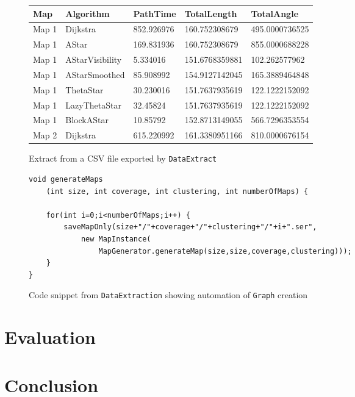 \documentclass[12pt,notitlepage]{report}
\begin{document}
\begin{figure}
\centering
    \begin{tabular}{| l | l | l | l | l |}
    \hline
    Map & Algorithm & PathTime & TotalLength & TotalAngle\\ \hline %
     Map 1 & Dijkstra & 852.926976 & 160.752308679 & 495.0000736525\\ \hline %
     Map 1 & AStar & 169.831936 & 160.752308679 & 855.0000688228\\ \hline %
     Map 1 & AStarVisibility & 5.334016 & 151.6768359881 & 102.262577962\\ \hline %
Map 1 & AStarSmoothed & 85.908992 & 154.9127142045 & 165.3889464848\\ \hline %
Map 1 & ThetaStar & 30.230016 & 151.7637935619 & 122.1222152092\\ \hline %
Map 1 & LazyThetaStar & 32.45824 & 151.7637935619 & 122.1222152092\\ \hline %
Map 1 & BlockAStar & 10.85792 & 152.8713149055 & 566.7296353554\\ \hline %
Map 2 & Dijkstra & 615.220992 & 161.3380951166 & 810.0000676154\\ \hline %
 \end{tabular}
\caption{Extract from a CSV file exported by {\tt DataExtract}}
\end{figure}

\begin{figure}
\begin{lstlisting}
void generateMaps 
	(int size, int coverage, int clustering, int numberOfMaps) {
	
	for(int i=0;i<numberOfMaps;i++) {
		saveMapOnly(size+"/"+coverage+"/"+clustering+"/"+i+".ser",
			new MapInstance(
				MapGenerator.generateMap(size,size,coverage,clustering)));
	}
}
\end{lstlisting}
\caption{Code snippet from {\tt DataExtraction} showing automation of {\tt Graph} creation}
\end{figure}

\chapter{Evaluation}

\chapter{Conclusion}

\appendix




\cleardoublepage
\end{document}
